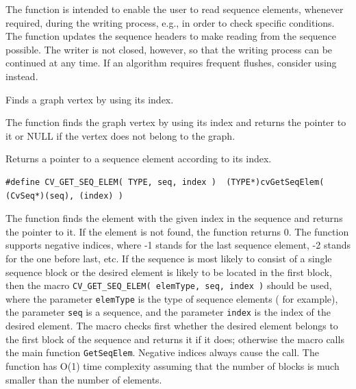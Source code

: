 The function is intended to enable the user to
read sequence elements, whenever required, during the writing process,
e.g., in order to check specific conditions. The function updates the
sequence headers to make reading from the sequence possible. The writer
is not closed, however, so that the writing process can be continued at
any time. If an algorithm requires frequent flushes, consider using
 instead.

Finds a graph vertex by using its index.


\begin{description}
\end{description}


The function finds the graph vertex by using its index and returns the pointer to it or NULL if the vertex does not belong to the graph.


Returns a pointer to a sequence element according to its index.


\begin{lstlisting}
#define CV_GET_SEQ_ELEM( TYPE, seq, index )  (TYPE*)cvGetSeqElem( (CvSeq*)(seq), (index) )
\end{lstlisting}

\begin{description}
\end{description}

The function finds the element with the given
index in the sequence and returns the pointer to it. If the element
is not found, the function returns 0. The function supports negative
indices, where -1 stands for the last sequence element, -2 stands for
the one before last, etc. If the sequence is most likely to consist of
a single sequence block or the desired element is likely to be located
in the first block, then the macro
\texttt{CV\_GET\_SEQ\_ELEM( elemType, seq, index )}
should be used, where the parameter \texttt{elemType} is the
type of sequence elements (  for example), the parameter
\texttt{seq} is a sequence, and the parameter \texttt{index} is the index
of the desired element. The macro checks first whether the desired element
belongs to the first block of the sequence and returns it if it does;
otherwise the macro calls the main function \texttt{GetSeqElem}. Negative
indices always cause the  call. The function has O(1)
time complexity assuming that the number of blocks is much smaller than the
number of elements.

